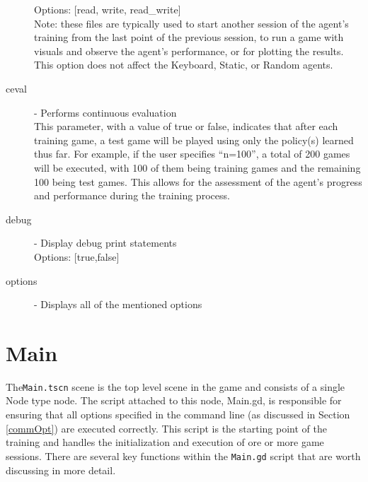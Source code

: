 \begin{description}
Options: [read, write, read\_write]\\
Note: these files are typically used to start another session of the agent's training from the last point of the previous session, to run a game with visuals and observe the agent's performance, or for plotting the results. This option does not affect the Keyboard, Static, or Random agents.
\item[ceval] - Performs continuous evaluation \label{opt:ceval}\\
This parameter, with a value of true or false, indicates that after each training game, a test game will be played using only the policy(s) learned thus far. For example, if the user specifies ``n=100'', a total of 200 games will be executed, with 100 of them being training games and the remaining 100 being test games. This allows for the assessment of the agent's progress and performance during the training process. 
\item[debug] - Display debug print statements \label{opt:debug}\\
Options: [true,false]
\item[options] - Displays all of the mentioned options \label{opt:options}\\
\end{description}

\section{Main}
The\texttt{Main.tscn} scene is the top level scene in the game and consists of a single Node type node. The script attached to this node, Main.gd, is responsible for ensuring that all options specified in the command line (as discussed in Section \ref{commOpt}) are executed correctly. This script is the starting point of the training and handles the initialization and execution of ore or more game sessions.
There are several key functions within the \texttt{Main.gd} script that are worth discussing in more detail.

